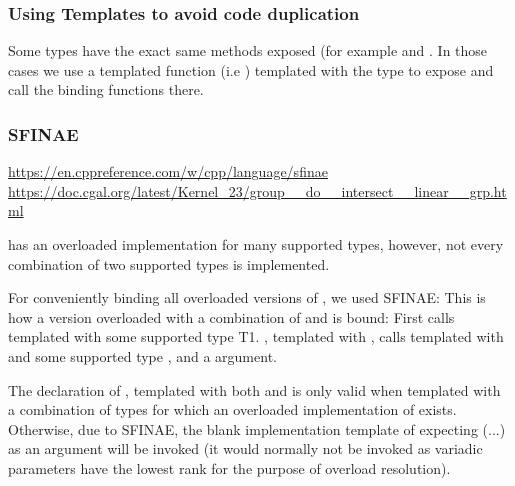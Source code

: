 \subsubsection{Using Templates to avoid code duplication}
\label{sec:bind:code:templates}
Some types have the exact same methods exposed (for example
 and
. In those cases we use a
templated function (i.e ) templated
with the type to expose and call the binding functions there.

\subsubsection{SFINAE}
\label{sec:bind:code:sfinae}
\url{https://en.cppreference.com/w/cpp/language/sfinae}
\url{https://doc.cgal.org/latest/Kernel_23/group__do__intersect__linear__grp.html}

 has an overloaded implementation for
many supported types, however, not every combination of two supported
types is implemented.

For conveniently binding all overloaded versions of
, we used SFINAE: This is how a
version overloaded with a combination of  and
 is bound: First 
calls  templated with some supported
type {T1}. , templated
with , calls 
templated with  and some supported type
, and a  argument.

The declaration of , templated with
both  and  is only valid when
templated with a combination of types for which an overloaded
implementation of  exists. Otherwise,
due to SFINAE, the blank implementation template of
 expecting (...) as an argument
will be invoked (it would normally not be invoked as variadic
parameters have the lowest rank for the purpose of overload
resolution).

